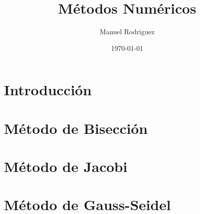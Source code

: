 \documentclass[a4paper, 12pt]{article}
\title{Métodos Numéricos}
\author{Manuel Rodriguez}
\date{\today}
\begin{document}
	
	\maketitle
	\tableofcontents
	
	\newpage
	
	\section{Introducción}
	
	\section[Bisección]{Método de Bisección}
	\section[]{}
	\section[Jacobi]{Método de Jacobi}
	\section[Gauss-Seidel]{Método de Gauss-Seidel}
\end{document}
